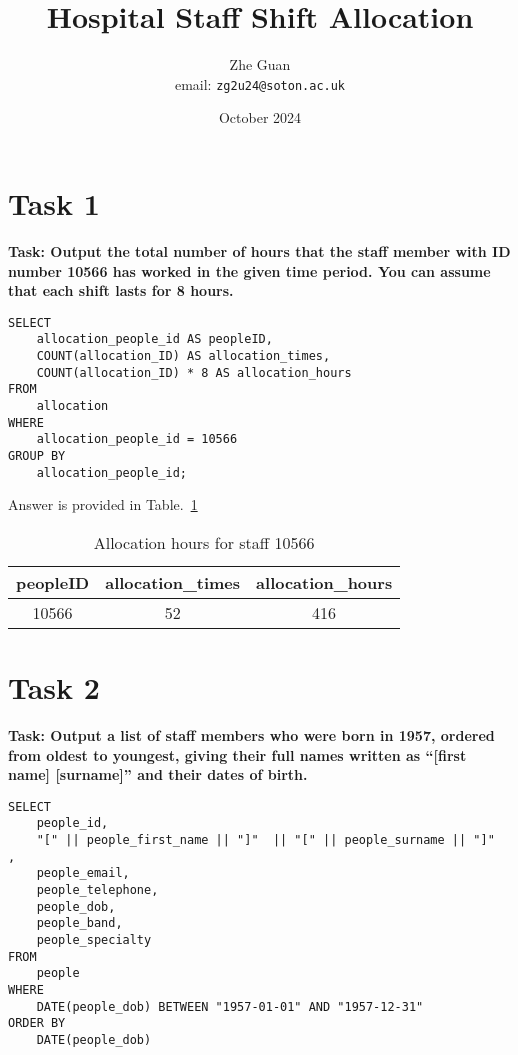 \documentclass{article}
\title{Hospital Staff Shift Allocation}
\author{Zhe Guan  \\ email: \texttt{zg2u24@soton.ac.uk}}
\date{October 2024}
\begin{document}
\maketitle

\section{Task 1}
\textbf{Task: Output the total number of hours that the staff member with ID number 10566 has worked in the given time period. You can assume that each shift lasts for 8 hours.}

\begin{lstlisting}[style=sqlstyle]
SELECT
    allocation_people_id AS peopleID,
    COUNT(allocation_ID) AS allocation_times,
    COUNT(allocation_ID) * 8 AS allocation_hours
FROM 
    allocation
WHERE 
    allocation_people_id = 10566
GROUP BY
    allocation_people_id;
\end{lstlisting}

Answer is provided in Table.~\ref{tab:task1}


\begin{table}[h]
    \centering
    \begin{tabular}{|c|c|c|}
        \hline
        peopleID & allocation\_times & allocation\_hours \\
        \hline
        10566 & 52 & 416 \\
        \hline
    \end{tabular}
    \caption{Allocation hours for staff 10566}
    \label{tab:task1}
\end{table}

\section{Task 2}

\textbf{Task: Output a list of staff members who were born in 1957, ordered from oldest to youngest, giving their full names written as “[first name] [surname]” and their dates of birth.}

\begin{lstlisting}[style=sqlstyle]
SELECT
    people_id,
    "[" || people_first_name || "]"  || "[" || people_surname || "]"  ,
    people_email,
    people_telephone,
    people_dob,
    people_band,
    people_specialty
FROM 
    people
WHERE 
    DATE(people_dob) BETWEEN "1957-01-01" AND "1957-12-31" 
ORDER BY
    DATE(people_dob)

\end{lstlisting}
\end{document}
